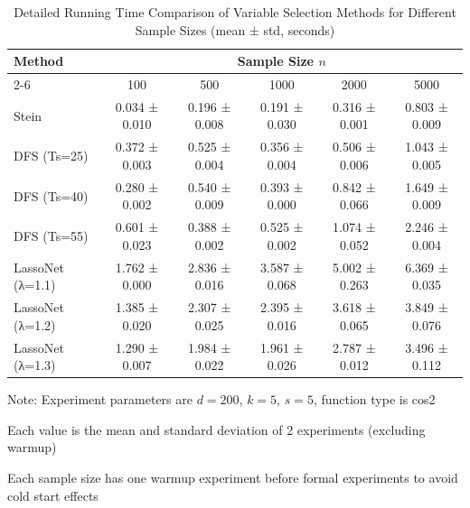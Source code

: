 
\begin{table}[htbp]
\centering
\caption{Detailed Running Time Comparison of Variable Selection Methods for Different Sample Sizes (mean ± std, seconds)}
\label{tab:detailed_time_comparison_sample_size}
\begin{tabular}{lccccc}
\toprule
Method & \multicolumn{5}{c}{Sample Size $n$} \\
\cmidrule{2-6}
 & 100 & 500 & 1000 & 2000 & 5000 \\
\midrule
Stein & 0.034 ± 0.010 & 0.196 ± 0.008 & 0.191 ± 0.030 & 0.316 ± 0.001 & 0.803 ± 0.009 \\
DFS (Ts=25) & 0.372 ± 0.003 & 0.525 ± 0.004 & 0.356 ± 0.004 & 0.506 ± 0.006 & 1.043 ± 0.005 \\
DFS (Ts=40) & 0.280 ± 0.002 & 0.540 ± 0.009 & 0.393 ± 0.000 & 0.842 ± 0.066 & 1.649 ± 0.009 \\
DFS (Ts=55) & 0.601 ± 0.023 & 0.388 ± 0.002 & 0.525 ± 0.002 & 1.074 ± 0.052 & 2.246 ± 0.004 \\
LassoNet (λ=1.1) & 1.762 ± 0.000 & 2.836 ± 0.016 & 3.587 ± 0.068 & 5.002 ± 0.263 & 6.369 ± 0.035 \\
LassoNet (λ=1.2) & 1.385 ± 0.020 & 2.307 ± 0.025 & 2.395 ± 0.016 & 3.618 ± 0.065 & 3.849 ± 0.076 \\
LassoNet (λ=1.3) & 1.290 ± 0.007 & 1.984 ± 0.022 & 1.961 ± 0.026 & 2.787 ± 0.012 & 3.496 ± 0.112 \\
\bottomrule
\end{tabular}
\begin{tablenotes}
\footnotesize
\item Note: Experiment parameters are $d=200$, $k=5$, $s=5$, function type is cos2
\item Each value is the mean and standard deviation of 2 experiments (excluding warmup)
\item Each sample size has one warmup experiment before formal experiments to avoid cold start effects
\end{tablenotes}
\end{table}
